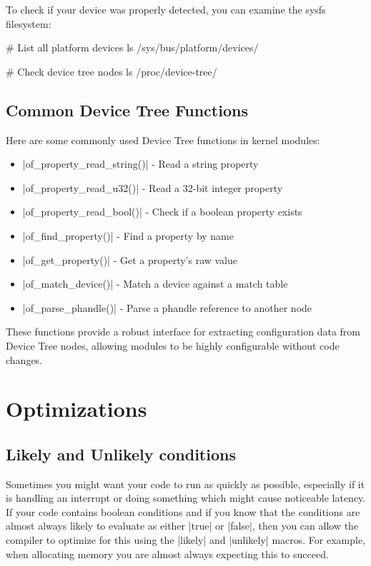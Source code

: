 \documentclass[10pt, oneside]{book}
\begin{document}
To check if your device was properly detected, you can examine the sysfs filesystem:

\begin{codebash}
# List all platform devices
ls /sys/bus/platform/devices/

# Check device tree nodes
ls /proc/device-tree/
\end{codebash}

\subsection{Common Device Tree Functions}
\label{sec:dt_functions}
Here are some commonly used Device Tree functions in kernel modules:

\begin{itemize}
  \item \cpp|of_property_read_string()| - Read a string property
  \item \cpp|of_property_read_u32()| - Read a 32-bit integer property
  \item \cpp|of_property_read_bool()| - Check if a boolean property exists
  \item \cpp|of_find_property()| - Find a property by name
  \item \cpp|of_get_property()| - Get a property's raw value
  \item \cpp|of_match_device()| - Match a device against a match table
  \item \cpp|of_parse_phandle()| - Parse a phandle reference to another node
\end{itemize}

These functions provide a robust interface for extracting configuration data from Device Tree nodes,
allowing modules to be highly configurable without code changes.

\section{Optimizations}
\label{sec:optimization}
\subsection{Likely and Unlikely conditions}
\label{sec:likely_unlikely}
Sometimes you might want your code to run as quickly as possible, especially if it is handling an interrupt or doing something which might cause noticeable latency.
If your code contains boolean conditions and if you know that the conditions are almost always likely to evaluate as either \cpp|true| or \cpp|false|,
then you can allow the compiler to optimize for this using the \cpp|likely| and \cpp|unlikely| macros.
For example, when allocating memory you are almost always expecting this to succeed.
\end{document}
